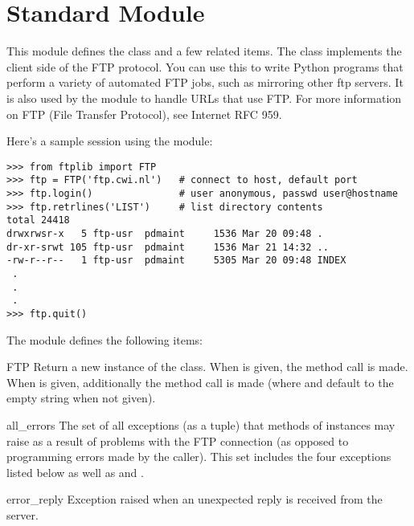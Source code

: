 \section{Standard Module }

\renewcommand{\indexsubitem}{(in module ftplib)}

This module defines the class  and a few related items.  The
 class implements the client side of the FTP protocol.  You
can use this to write Python programs that perform a variety of
automated FTP jobs, such as mirroring other ftp servers.  It is also
used by the module  to handle URLs that use FTP.  For
more information on FTP (File Transfer Protocol), see Internet RFC
959.

Here's a sample session using the  module:

\begin{verbatim}
>>> from ftplib import FTP
>>> ftp = FTP('ftp.cwi.nl')   # connect to host, default port
>>> ftp.login()               # user anonymous, passwd user@hostname
>>> ftp.retrlines('LIST')     # list directory contents
total 24418
drwxrwsr-x   5 ftp-usr  pdmaint     1536 Mar 20 09:48 .
dr-xr-srwt 105 ftp-usr  pdmaint     1536 Mar 21 14:32 ..
-rw-r--r--   1 ftp-usr  pdmaint     5305 Mar 20 09:48 INDEX
 .
 .
 .
>>> ftp.quit()
\end{verbatim}

The module defines the following items:

\begin{funcdesc}{FTP}{}
Return a new instance of the  class.  When
 is given, the method call  is
made.  When  is given, additionally the method call
 is made (where
 and  default to the empty string when not given).
\end{funcdesc}

\begin{datadesc}{all_errors}
The set of all exceptions (as a tuple) that methods of 
instances may raise as a result of problems with the FTP connection
(as opposed to programming errors made by the caller).  This set
includes the four exceptions listed below as well as
 and .
\end{datadesc}

\begin{excdesc}{error_reply}
Exception raised when an unexpected reply is received from the server.
\end{excdesc}

